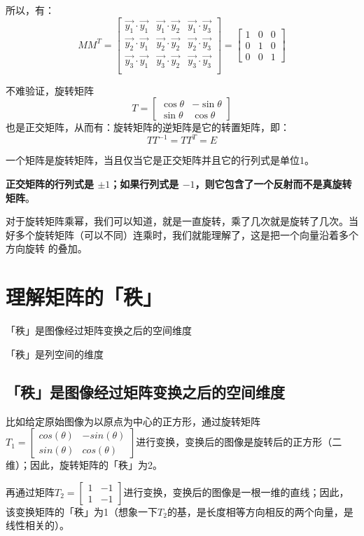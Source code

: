 \documentclass[12pt]{article}
\begin{document}
所以，有：
$$
MM^T = \begin{bmatrix}
\vec{y_1}\cdot\vec{y_1} & \vec{y_1}\cdot\vec{y_2} & \vec{y_1}\cdot\vec{y_3} \\
\vec{y_2}\cdot\vec{y_1} & \vec{y_2}\cdot\vec{y_2} & \vec{y_2}\cdot\vec{y_3} \\
\vec{y_3}\cdot\vec{y_1} & \vec{y_3}\cdot\vec{y_2} & \vec{y_3}\cdot\vec{y_3} \\
\end{bmatrix} = 
\begin{bmatrix}
1 & 0 & 0 \\ 0 & 1 & 0 \\ 0 & 0 & 1
\end{bmatrix}
$$

不难验证，旋转矩阵
$$
T = \begin{bmatrix}
\cos\theta & -\sin\theta \\ \sin\theta & \cos\theta
\end{bmatrix}
$$
也是正交矩阵，从而有：旋转矩阵的逆矩阵是它的转置矩阵，即：
$$
TT^{-1} = TT^T = E
$$

一个矩阵是旋转矩阵，当且仅当它是正交矩阵并且它的行列式是单位1。

\textbf{正交矩阵的行列式是 $\pm 1$；如果行列式是 $−1$，则它包含了一个反射而不是真旋转矩阵}。

对于旋转矩阵乘幂，我们可以知道，就是一直旋转，乘了几次就是旋转了几次。当好多个旋转矩阵（可以不同）连乘时，我们就能理解了，这是把一个向量沿着多个方向旋转 的叠加。

\section{理解矩阵的「秩」\cite{How_To_Understand_Rank_Of_Matrix}}
「秩」是图像经过矩阵变换之后的空间维度

「秩」是列空间的维度

\subsection{「秩」是图像经过矩阵变换之后的空间维度}
比如给定原始图像为以原点为中心的正方形，通过旋转矩阵$T_1=\begin{bmatrix}cos(\theta)&-sin(\theta)\\sin(\theta)&cos(\theta)\end{bmatrix}$进行变换，变换后的图像是旋转后的正方形（二维）；因此，旋转矩阵的「秩」为2。

再通过矩阵$T_2=\begin{bmatrix}1&-1\\1&-1\end{bmatrix}$进行变换，变换后的图像是一根一维的直线；因此，该变换矩阵的「秩」为1（想象一下$T_2$的基，是长度相等方向相反的两个向量，是线性相关的）。
\end{document}
